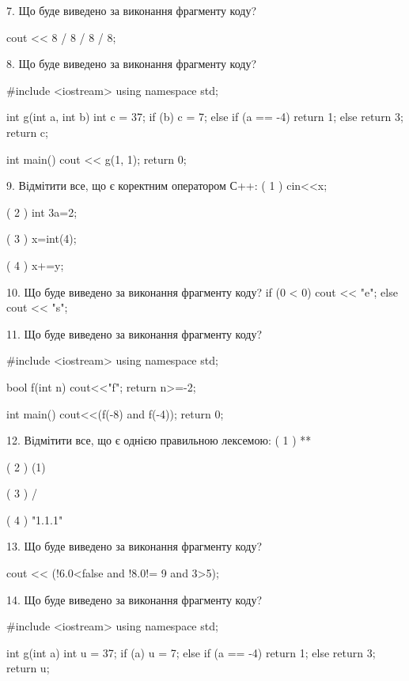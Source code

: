 \documentclass[11pt, ukrainian]{article}
\begin{document}
\begin{large}

7. Що буде виведено за виконання фрагменту коду?

cout << 8 / 8 / 8 / 8;


8. Що буде виведено за виконання фрагменту коду?

#include <iostream>
using namespace std;

int g(int a, int b){
    int c = 37;
    if (b)
        c = 7;
    else if (a == -4)
         return 1;
    else 
        return 3;
    return c;
}

int main(){
    cout << g(1, 1);
    return 0;
}


9. Відмітити все, що є коректним оператором С++:
( 1 ) cin<<x;

( 2 ) int 3a=2;

( 3 ) x=int(4);

( 4 ) x+=y;


10. Що буде виведено за виконання фрагменту коду?
if (0 < 0)
    cout << "e";
else
    cout << "s";



11. Що буде виведено за виконання фрагменту коду?

#include <iostream>
using namespace std;

bool f(int n){
    cout<<"f";
    return n>=-2;
}

int main(){
    cout<<(f(-8) and f(-4));
    return 0;
}


12. Відмітити все, що є однією правильною лексемою:
( 1 ) **

( 2 ) (1)

( 3 ) /

( 4 ) "1.1.1"


13. Що буде виведено за виконання фрагменту коду?

cout << (!6.0<false and !8.0!= 9 and 3>5);


14. Що буде виведено за виконання фрагменту коду?

#include <iostream>
using namespace std;

int g(int a){
    int u = 37;
    if (a) 
        u = 7;
    else if (a == -4)
         return 1;
    else
         return 3;
    return u;
}


\end{large}
\end{document}

